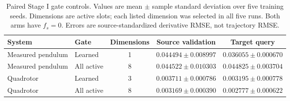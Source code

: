 \begin{table}[!ht]
\centering\small
\caption{Paired Stage I gate controls. Values are mean $\pm$ sample standard deviation over five training seeds. Dimensions are active slots; each listed dimension was selected in all five runs. Both arms have $f_s=0$. Errors are source-standardized derivative RMSE, not trajectory RMSE.}
\label{tab:paired_gate}
\setlength{\tabcolsep}{5pt}
\begin{tabular}{llccc}
\toprule
System & Gate & Dimensions & Source validation & Target query \\
\midrule
Measured pendulum & Learned & 1 & $0.044494 \pm 0.008997$ & $0.036055 \pm 0.000670$ \\
Measured pendulum & All active & 8 & $0.044522 \pm 0.010303$ & $0.044825 \pm 0.003704$ \\
Quadrotor & Learned & 3 & $0.003711 \pm 0.000786$ & $0.003195 \pm 0.000778$ \\
Quadrotor & All active & 8 & $0.003169 \pm 0.000390$ & $0.002777 \pm 0.000622$ \\
\bottomrule
\end{tabular}
\end{table}

